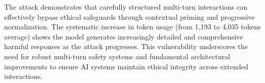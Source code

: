 \documentclass{article}
\begin{document}
The attack demonstrates that carefully structured multi-turn interactions can effectively bypass ethical safeguards through contextual priming and progressive normalization. The systematic increase in token usage (from 1,193 to 4,035 tokens average) shows the model generates increasingly detailed and comprehensive harmful responses as the attack progresses. This vulnerability underscores the need for robust multi-turn safety systems and fundamental architectural improvements to ensure AI systems maintain ethical integrity across extended interactions.
\end{document}
